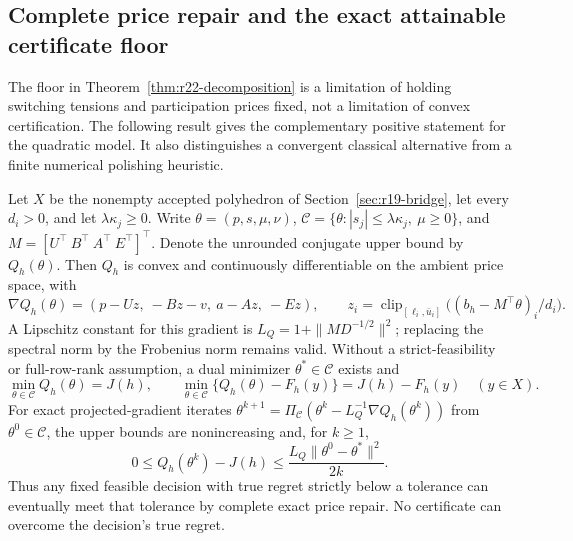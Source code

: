 \subsection{Complete price repair and the exact attainable certificate floor}\label{sec:r22-complete}
The floor in Theorem~\ref{thm:r22-decomposition} is a limitation of holding switching tensions and participation prices fixed, not a limitation of convex certification. The following result gives the complementary positive statement for the quadratic model. It also distinguishes a convergent classical alternative from a finite numerical polishing heuristic.

\begin{theorem}\label{thm:r22-complete}
Let $X$ be the nonempty accepted polyhedron of Section~\ref{sec:r19-bridge}, let every $d_i>0$, and let $\lambda\kappa_j\geq0$. Write $\theta=(p,s,\mu,\nu)$,
$\mathcal C=\{\theta:|s_j|\leq\lambda\kappa_j,\ \mu\geq0\}$,
and $M=[U^\top\ B^\top\ A^\top\ E^\top]^\top$.
Denote the unrounded conjugate upper bound by $Q_h(\theta)$. Then $Q_h$ is convex and continuously differentiable on the ambient price space, with
\begin{equation}\label{eq:r22-complete-gradient}
 \nabla Q_h(\theta)=(p-Uz,\ -Bz-v,\ a-Az,\ -Ez),\qquad
 z_i=\operatorname{clip}_{[\ell_i,\bar u_i]}\big((b_h-M^\top\theta)_i/d_i\big).
\end{equation}
A Lipschitz constant for this gradient is
$L_Q=1+\|MD^{-1/2}\|^2$; replacing the spectral norm by the Frobenius norm remains valid. Without a strict-feasibility or full-row-rank assumption, a dual minimizer $\theta^*\in\mathcal C$ exists and
\begin{equation}\label{eq:r22-exact-floor}
 \min_{\theta\in\mathcal C}Q_h(\theta)=J(h),\qquad
 \min_{\theta\in\mathcal C}\{Q_h(\theta)-F_h(y)\}=J(h)-F_h(y)
 \quad(y\in X).
\end{equation}
For exact projected-gradient iterates
$\theta^{k+1}=\Pi_{\mathcal C}(\theta^k-L_Q^{-1}\nabla Q_h(\theta^k))$
from $\theta^0\in\mathcal C$, the upper bounds are nonincreasing and, for $k\geq1$,
\begin{equation}\label{eq:r22-complete-rate}
 0\leq Q_h(\theta^k)-J(h)
 \leq \frac{L_Q\|\theta^0-\theta^*\|^2}{2k}.
\end{equation}
Thus any fixed feasible decision with true regret strictly below a tolerance can eventually meet that tolerance by complete exact price repair. No certificate can overcome the decision's true regret.
\end{theorem}
